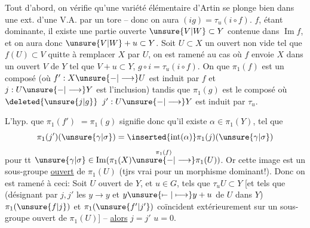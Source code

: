 Tout d'abord, on vérifie qu'une variété élémentaire d'Artin se plonge bien  dans une ext. d'une V.A. par un tore -- donc on aura $(ig)=\tau_u(i\circ f)$.    $f$, étant dominante, il existe une partie ouverte  $\unsure{V|W}\subset Y$ contenue dans $\operatorname{Im}f$, et on aura donc $\unsure{V|W}+u\subset Y$. Soit $U\subset X$ un ouvert non vide tel que $f(U)\subset V$   quitte à remplacer $X$ par $U$, on est ramené au cas où $f$ envoie $X$ dans un ouvert $V$ de $Y$ tel que $V+u\subset Y$,  $g\circ i=\tau_u(i\circ f)$. On   que $\pi_1(f)$ est un composé (où $f':X\unsure{-|\longrightarrow}U$ est  induit par $f$ et $j:U\unsure{-|\longrightarrow}Y$ est l'inclusion)
tandis que $\pi_1(g)$ est le composé
où $\deleted{\unsure{j|g}}$ $j':U\unsure{-|\longrightarrow}Y$ est induit par $\tau_u$.

L'hyp. que $\pi_1(f')$  $=\pi_1(g)$ signifie donc qu'il existe $\alpha\in\pi_1(Y)$, tel que
\[
\pi_1(j')(\unsure{\gamma|\sigma})=\inserted{\operatorname{int}(\alpha)}\pi_1(j)(\unsure{\gamma|\sigma})
\]
pour tt $\unsure{\gamma|\sigma}\in\operatorname{Im}(\pi_1(X)\overset{\pi_1(f)}{\unsure{-|\longrightarrow}}\pi_1(U))$. Or cette image est un sous-groupe \uline{ouvert} de $\pi_1(U)$ (tjrs vrai pour un morphisme dominant!).  Donc on est ramené à ceci: Soit $U$ ouvert \inserted{$\ne\varnothing$} de $Y$, et $u\in G$, tels que $\tau_uU\subset Y$ [et tels que (désignant par $j,j'$ les   $y\longrightarrow y$ et $y\unsure{\mapstochar\relbar|\longmapsto}y+u$ de $U$ dans $Y$) $\pi_1(\unsure{f|j})$ et $\pi_1(\unsure{f'|j'})$ coïncident extérieurement sur un sous-groupe ouvert de $\pi_1(U)$] -- \uline{alors} $j=j'$  $u=0$.

